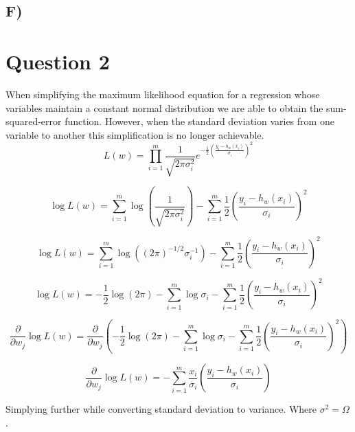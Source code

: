 \documentclass{report}
\begin{document}
\subsection*{F)}

\section*{Question 2}
When simplifying the maximum likelihood equation for a regression whose variables
maintain a constant normal distribution we are able to obtain the sum-squared-error
function. However, when the standard deviation varies from one variable to another
this simplification is no longer achievable.
  \begin{equation}
     L(w) = \prod_{i=1}^{m} \frac{1}{\sqrt{2\pi\sigma_i^2}}e ^ {-\frac{1}{2}\left(\frac{y_i-h_w(x_i)}{\sigma_i}\right)^2}
  \end{equation}

  \begin{equation}
     \log L(w) = \sum_{i=1}^{m} \log \left(\frac{1}{\sqrt{2\pi\sigma_i^2}}\right)
     - \sum_{i=1}^{m} \frac{1}{2}\left(\frac{y_i-h_w(x_i)}{\sigma_i}\right)^2
  \end{equation}

  \begin{equation}
     \log L(w) = \sum_{i=1}^{m} \log \left((2\pi)^{-1/2}\sigma_i^{-1}\right)
     - \sum_{i=1}^{m} \frac{1}{2}\left(\frac{y_i-h_w(x_i)}{\sigma_i}\right)^2
  \end{equation}

  \begin{equation}
     \log L(w) = -\frac{1}{2} \log(2\pi)
     - \sum_{i=1}^{m} \log \sigma_i
     - \sum_{i=1}^{m} \frac{1}{2}\left(\frac{y_i-h_w(x_i)}{\sigma_i}\right)^2
  \end{equation}

\begin{equation}
     \frac{\partial}{\partial w_j} \log L(w)
     = \frac{\partial}{\partial w_j} \left(-\frac{1}{2} \log(2\pi)
     - \sum_{i=1}^{m} \log \sigma_i
     - \sum_{i=1}^{m} \frac{1}{2}\left(\frac{y_i-h_w(x_i)}{\sigma_i}\right)^2\right)
\end{equation}

\begin{equation}
     \frac{\partial}{\partial w_j} \log L(w) =
     - \sum_{i=1}^{m} \frac{x_i}{\sigma_i}\left(\frac{y_i-h_w(x_i)}{\sigma_i}\right)
\end{equation}

Simplying further while converting standard deviation to variance. Where $\sigma^2 = \Omega$.
\end{document}
